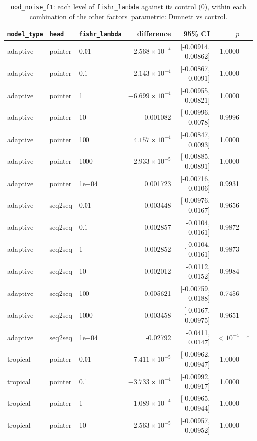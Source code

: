 \documentclass[10pt]{article}
\begin{document}
{\small
\begin{longtable}{lllrrrl}
\caption{\texttt{ood\_noise\_f1}: each level of \texttt{fishr\_lambda} against its control (0), within each combination of the other factors. parametric: Dunnett vs control.}\label{tab:control-ood_noise_f1}\\
\toprule
\texttt{model\_type} & \texttt{head} & \texttt{fishr\_lambda} & difference & 95\% CI & $p$ & \\
\midrule
\endhead
adaptive & pointer & 0.01 & $-2.568\times10^{-4}$ & [-0.00914, 0.00862] & 1.0000 & \\
adaptive & pointer & 0.1 & $2.143\times10^{-4}$ & [-0.00867, 0.0091] & 1.0000 & \\
adaptive & pointer & 1 & $-6.699\times10^{-4}$ & [-0.00955, 0.00821] & 1.0000 & \\
adaptive & pointer & 10 & -0.001082 & [-0.00996, 0.0078] & 0.9996 & \\
adaptive & pointer & 100 & $4.157\times10^{-4}$ & [-0.00847, 0.0093] & 1.0000 & \\
adaptive & pointer & 1000 & $2.933\times10^{-5}$ & [-0.00885, 0.00891] & 1.0000 & \\
adaptive & pointer & 1e+04 & 0.001723 & [-0.00716, 0.0106] & 0.9931 & \\
adaptive & seq2seq & 0.01 & 0.003448 & [-0.00976, 0.0167] & 0.9656 & \\
adaptive & seq2seq & 0.1 & 0.002857 & [-0.0104, 0.0161] & 0.9872 & \\
adaptive & seq2seq & 1 & 0.002852 & [-0.0104, 0.0161] & 0.9873 & \\
adaptive & seq2seq & 10 & 0.002012 & [-0.0112, 0.0152] & 0.9984 & \\
adaptive & seq2seq & 100 & 0.005621 & [-0.00759, 0.0188] & 0.7456 & \\
adaptive & seq2seq & 1000 & -0.003458 & [-0.0167, 0.00975] & 0.9651 & \\
adaptive & seq2seq & 1e+04 & -0.02792 & [-0.0411, -0.0147] & $<10^{-4}$ & *\\
tropical & pointer & 0.01 & $-7.411\times10^{-5}$ & [-0.00962, 0.00947] & 1.0000 & \\
tropical & pointer & 0.1 & $-3.733\times10^{-4}$ & [-0.00992, 0.00917] & 1.0000 & \\
tropical & pointer & 1 & $-1.089\times10^{-4}$ & [-0.00965, 0.00944] & 1.0000 & \\
tropical & pointer & 10 & $-2.563\times10^{-5}$ & [-0.00957, 0.00952] & 1.0000 & \\

\end{longtable}}
\end{document}
